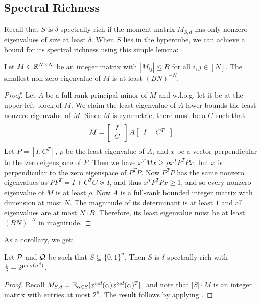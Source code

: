 \subsection{Spectral Richness}
Recall that $S$ is $\delta$-spectrally rich if the moment matrix $M_{S,d}$ has only nonzero eigenvalues of size at least $\delta$. When $S$ lies in the hypercube, we can achieve a bound for its spectral richness using this simple lemma:
\begin{lemma} \label{lem:integer}
	Let $M \in \mathbb R^{N \times N}$ be an integer matrix with $|M_{ij}| \leq B$ for all $i,j \in [N]$.  The smallest non-zero eigenvalue of $M$ is at least 
	$(BN)^{-N}$.
\end{lemma}
\begin{proof}
Let $A$ be a full-rank principal minor of $M$ and w.l.o.g. let it be at the upper-left block of $M$. We claim the least eigenvalue of $A$ lower bounds the least nonzero eigenvalue of $M$.
%
Since $M$ is symmetric, there must be a $C$ such that
\[M = \left[\begin{tabular}{c} $I$ \\ $C$\end{tabular}\right]A\left[\begin{tabular}{cc} $I$ & $C^T$\end{tabular}\right].\]
Let $P = [I, C^T]$, $\rho$ be the least eigenvalue of $A$, and $x$ be a vector perpendicular to the zero eigenspace of $P$. Then we have $x^TMx \geq \rho x^TP^TPx$,
but $x$ is perpendicular to the zero eigenspace of $P^TP$. Now $P^TP$ has the same nonzero eigenvalues as $PP^T = I + C^TC \succeq I$, and thus $x^TP^TPx \geq 1$, and so every nonzero eigenvalue of $M$ is at least $\rho$. Now $A$ is a full-rank bounded integer matrix with dimension at most $N$. The magnitude of its determinant is at least $1$ and all eigenvalues are at most $N \cdot B$.  Therefore, its least eigenvalue must be at least $(BN)^{-N}$ in magnitude. 
\end{proof}
As a corollary, we get:
\begin{corollary}\label{cor:integer-rich}
Let $\mathcal P$ and $\mathcal Q$ be such that $S \subseteq \{0,1\}^n$. Then $S$ is $\delta$-spectrally rich with $\frac{1}{\delta} = 2^{\operatorname{poly}(n^d)}$.
\end{corollary}
\begin{proof}
	Recall $M_{S,d} = \operatorname*{\mathbb{E}}_{\alpha \in S}[x^{\otimes d}(\alpha)x^{\otimes d}(\alpha)^T]$, and note that $|S| \cdot M$ is an integer matrix with entries at most $2^n$.  The result follows by applying . 
\end{proof}

